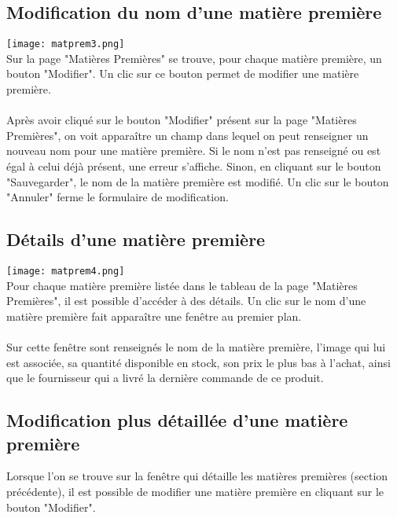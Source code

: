 \subsection{Modification du nom d'une matière première}
\texttt{[image: matprem3.png]}\\
Sur la page "Matières Premières" se trouve, pour chaque matière première,
un bouton "Modifier". Un clic sur ce bouton permet de modifier une matière
première.

\paragraph{}
Après avoir cliqué sur le bouton "Modifier" présent sur la page "Matières
Premières", on voit apparaître un champ dans lequel on peut renseigner un
nouveau nom pour une matière première. Si le nom n'est pas renseigné ou est
égal à celui déjà présent, une erreur s'affiche. Sinon, en cliquant sur le
bouton "Sauvegarder", le nom de la matière première est modifié. Un clic sur
le bouton "Annuler" ferme le formulaire de modification.


\subsection{Détails d'une matière première}
\texttt{[image: matprem4.png]}\\
Pour chaque matière première listée dans le tableau de la page "Matières
Premières", il est possible d'accéder à des détails. Un clic sur le nom d'une
matière première fait apparaître une fenêtre au premier plan.

\paragraph{}
Sur cette fenêtre sont renseignés le nom de la matière première, l'image qui lui
est associée, sa quantité disponible en stock, son prix le plus bas à l'achat,
ainsi que le fournisseur qui a livré la dernière commande de ce produit.

\subsection{Modification plus détaillée d'une matière première}
Lorsque l'on se trouve sur la fenêtre qui détaille les matières premières
(section précédente), il est possible de modifier une matière première en
cliquant sur le bouton "Modifier".


